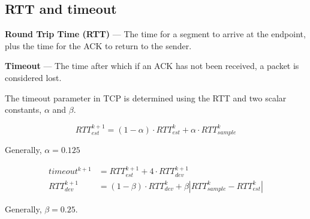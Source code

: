 \subsection{RTT and timeout}

\textbf{Round Trip Time (RTT)} --- The time for a segment to arrive at the endpoint, plus the time for the ACK to return to the sender.

\textbf{Timeout} --- The time after which if an ACK has not been received, a packet is considered lost.

The timeout parameter in TCP is determined using the RTT and two scalar constants, $\alpha$ and $\beta$.

\begin{equation}
    RTT_{est}^{k+1} = (1-\alpha)\cdot RTT_{est}^k + \alpha\cdot RTT_{sample}^k
\end{equation}

Generally, $\alpha = 0.125$

\begin{equation}
    \begin{split}
        timeout^{k+1} &= RTT_{est}^{k+1}+4\cdot RTT_{dev}^{k+1} \\
        RTT_{dev}^{k+1} &= (1-\beta)\cdot RTT_{dev}^k + \beta |RTT_{sample}^k - RTT_{est}^k|
    \end{split}
\end{equation}

Generally, $\beta=0.25$.